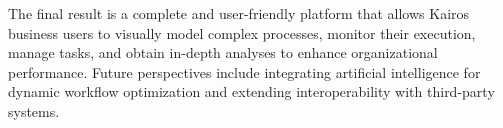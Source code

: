 \documentclass[12pt,a4paper,oneside]{extbook}
\begin{document}
The final result is a complete and user-friendly platform that allows Kairos business users to visually model complex processes, monitor their execution, manage tasks, and obtain in-depth analyses to enhance organizational performance. Future perspectives include integrating artificial intelligence for dynamic workflow optimization and extending interoperability with third-party systems.









\cleardoublepage
{}
\nocite{*}


\end{document}
